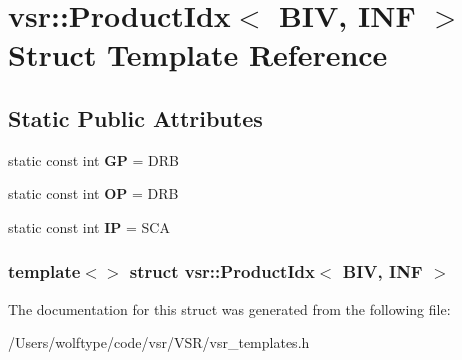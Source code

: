 \hypertarget{structvsr_1_1_product_idx_3_01_b_i_v_00_01_i_n_f_01_4}{\section{vsr\-:\-:Product\-Idx$<$ B\-I\-V, I\-N\-F $>$ Struct Template Reference}
\label{structvsr_1_1_product_idx_3_01_b_i_v_00_01_i_n_f_01_4}
}
\subsection*{Static Public Attributes}
\begin{DoxyCompactItemize}
\item 
\hypertarget{structvsr_1_1_product_idx_3_01_b_i_v_00_01_i_n_f_01_4_a925d62fd720c517820e57e67ebb4b233}{static const int {\bfseries G\-P} = D\-R\-B}\label{structvsr_1_1_product_idx_3_01_b_i_v_00_01_i_n_f_01_4_a925d62fd720c517820e57e67ebb4b233}

\item 
\hypertarget{structvsr_1_1_product_idx_3_01_b_i_v_00_01_i_n_f_01_4_a6f4566e048ff9994ba5962332ec4fd54}{static const int {\bfseries O\-P} = D\-R\-B}\label{structvsr_1_1_product_idx_3_01_b_i_v_00_01_i_n_f_01_4_a6f4566e048ff9994ba5962332ec4fd54}

\item 
\hypertarget{structvsr_1_1_product_idx_3_01_b_i_v_00_01_i_n_f_01_4_a28771c475760adedc5fb27168baae6ba}{static const int {\bfseries I\-P} = S\-C\-A}\label{structvsr_1_1_product_idx_3_01_b_i_v_00_01_i_n_f_01_4_a28771c475760adedc5fb27168baae6ba}

\end{DoxyCompactItemize}
\subsubsection*{template$<$$>$ struct vsr\-::\-Product\-Idx$<$ B\-I\-V, I\-N\-F $>$}



The documentation for this struct was generated from the following file\-:\begin{DoxyCompactItemize}
\item 
/\-Users/wolftype/code/vsr/\-V\-S\-R/vsr\-\_\-templates.\-h\end{DoxyCompactItemize}
